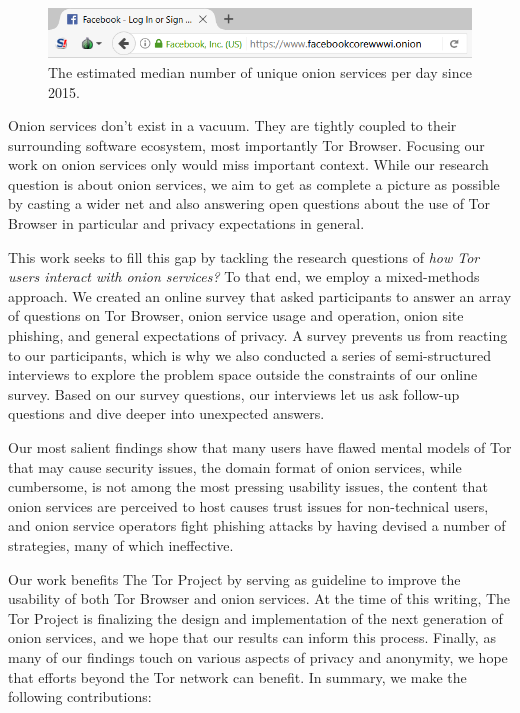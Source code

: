 \begin{figure}[t]
\includegraphics[width=\linewidth]{figures/onion-service-interface.png}
\caption{The estimated median number of unique onion services per day since
2015.}
\label{fig:os-interface}
\end{figure}

Onion services don't exist in a vacuum.  They are tightly coupled to their
surrounding software ecosystem, most importantly Tor Browser.  Focusing our work
on onion services only would miss important context.  While our research
question is about onion services, we aim to get as complete a picture as
possible by casting a wider net and also answering open questions about the use
of Tor Browser in particular and privacy expectations in general.

This work seeks to fill this gap by tackling the research questions of \emph{how
Tor users interact with onion services?}  To that end, we employ a mixed-methods
approach.  We created an online survey that asked participants to answer an
array of questions on Tor Browser, onion service usage and operation, onion site
phishing, and general expectations of privacy.  A survey prevents us from
reacting to our participants, which is why we also conducted a series of
semi-structured interviews to explore the problem space outside the constraints
of our online survey.  Based on our survey questions, our interviews let us ask
follow-up questions and dive deeper into unexpected answers.

Our most salient findings show that \first many users have flawed mental models
of Tor that may cause security issues, \second the domain format of onion
services, while cumbersome, is not among the most pressing usability issues,
\third the content that onion services are perceived to host causes trust issues
for non-technical users, and \fourth onion service operators fight phishing
attacks by having devised a number of strategies, many of which ineffective.

Our work benefits The Tor Project by serving as guideline to improve the
usability of both Tor Browser and onion services.  At the time of this writing,
The Tor Project is finalizing the design and implementation of the next
generation of onion services, and we hope that our results can inform this
process.  Finally, as many of our findings touch on various aspects of privacy
and anonymity, we hope that efforts beyond the Tor network can benefit.  In
summary, we make the following contributions:

